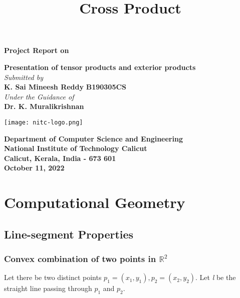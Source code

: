 \documentclass{article}
\title{Cross Product}
\date{}
\begin{document}
\setlength{\parindent}{20pt}
\begin{titlepage}
\begin{center}
\vspace{1cm}
\normalsize
\textbf{Project Report on}\\
\vspace{0.5cm}

\Large
\textbf{Presentation of tensor products and exterior products}\\
\vspace{0.5cm}
\emph{Submitted by}\\        
\vspace{0.5cm}
\large
\textbf{K. Sai Mineesh Reddy} \hspace{0.75cm}    
\textbf{B190305CS}\\
\vspace{0.2cm}
\emph{Under the Guidance of}\\ 
\large
\vspace{0.5cm}
\textbf{Dr. K. Muralikrishnan} 

\vspace{.5cm}
\begin{center}
 \texttt{[image: nitc-logo.png]}
\end{center}
\vspace{0.8cm}
\textbf{Department of Computer Science and Engineering}\\
\textbf{National Institute of Technology Calicut}\\
\textbf{Calicut, Kerala, India - 673 601}\\
\vspace{0.8cm}
\textbf{October 11, 2022} %
\end{center}
\end{titlepage}

\maketitle

\section{Computational Geometry}
    \subsection{Line-segment Properties}
    \subsubsection{\textbf{Convex combination of two points in $\mathbb{R}^{2}$}}
    \hspace{2cm} Let there be two distinct points $p_{1}=(x_{1},y_{1}), p_{2}=(x_{2},y_{2})$. Let \emph{l} be the straight line passing through $p_{1}$ and $p_{2}$.
    
\end{document}

